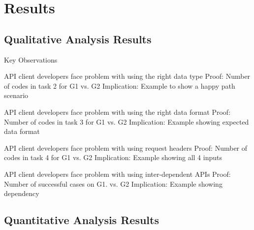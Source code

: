 \documentclass[conference]{IEEEtran}
\begin{document}
\section{Results}

\subsection{Qualitative Analysis Results} %

  Key Observations

  API client developers face problem with using the right data type
    Proof: Number of codes in task 2 for G1 vs. G2
    Implication: Example to show a happy path scenario

  API client developers face problem with using the right data format
    Proof: Number of codes in task 3 for G1 vs. G2
    Implication: Example showing expected data format

  API client developers face problem with using request headers
    Proof: Number of codes in task 4 for G1 vs. G2
    Implication: Example showing all 4 inputs

  API client developers face problem with using inter-dependent APIs
    Proof: Number of successful cases on G1. vs. G2
    Implication: Example showing dependency


\subsection{Quantitative Analysis Results} %

\pgfplotsset{compat=1.14}
\usetikzlibrary{patterns}
\groupone
\end{document}
